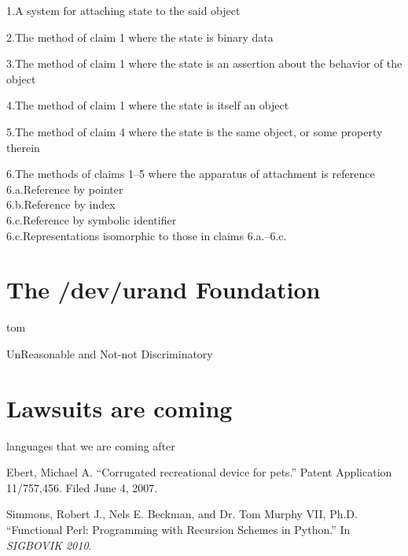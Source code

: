 \documentclass[acmtocl]%
{boviktrans}
\begin{document}
1.\quad A system for attaching state to the said object

2.\quad The method of claim 1 where the state is binary data

3.\quad The method of claim 1 where the state is an assertion about the behavior of the object

4.\quad The method of claim 1 where the state is itself an object

5.\quad The method of claim 4 where the state is the same object, or some property therein

6.\quad The methods of claims 1--5 where the apparatus of attachment is reference \\
6.a.\quad Reference by pointer \\
6.b.\quad Reference by index \\
6.c.\quad Reference by symbolic identifier \\
6.c.\quad Representations isomorphic to those in claims 6.a.--6.c.



\section{The /dev/urand Foundation}

tom

UnReasonable and Not-not Discriminatory

\section{Lawsuits are coming}

languages that we are coming after


\begin{thebibliography}{1}


Ebert, Michael A.
\newblock ``Corrugated recreational device for pets.''
\newblock Patent Application 11/757,456.
\newblock Filed June 4, 2007.

Simmons, Robert J., Nels E. Beckman, and Dr. Tom Murphy VII, Ph.D.
\newblock ``Functional Perl: Programming with Recursion Schemes in Python.''
\newblock In {\it SIGBOVIK 2010}.

\end{thebibliography}
\end{document}
